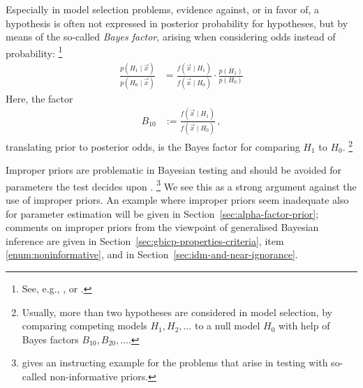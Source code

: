 Especially in model selection problems, evidence against, or in favor of, a hypothesis
is often not expressed in posterior probability for hypotheses, but by means of the so-called \emph{Bayes factor},
arising when considering odds instead of probability:%
\footnote{See, e.g., \textcite[\S 5.2.2, Def.~5.2.5, p.~227]{2007:robert}, or \textcite[p.~776]{1995:kass-raftery}.}
\begin{align*}
\frac{p(H_1\mid\vec{x})}{p(H_0\mid\vec{x})} &= \frac{f(\vec{x}\mid H_1)}{f(\vec{x}\mid H_0)} \cdot \frac{p(H_1)}{p(H_0)}
\end{align*}
Here, the factor
\begin{align*}
B_{10} &:= \frac{f(\vec{x}\mid H_1)}{f(\vec{x}\mid H_0)}\,,
\end{align*}
translating prior to posterior odds, is the Bayes factor for comparing $H_1$ to $H_0$.%
\footnote{Usually, more than two hypotheses are considered in model selection,
by comparing competing models $H_1, H_2, \ldots$ to a null model $H_0$
with help of Bayes factors $B_{10}, B_{20}, \ldots$.}

Improper priors are problematic in Bayesian testing \parencite[\S 5.2.5]{2007:robert}
and should be avoided for parameters the test decides upon \parencite[p.~782]{1995:kass-raftery}.%
\footnote{\Textcite[\S 5.5.4 (j)]{1991:walley} gives an instructing example for the problems
that arise in testing with so-called non-informative priors.}
We see this as a strong argument against the use of improper priors.
An example where improper priors seem inadequate also for parameter estimation
will be given in Section~\ref{sec:alpha-factor-prior};
comments on improper priors from the viewpoint of generalised Bayesian inference
are given in Section~\ref{sec:gbicp-properties-criteria},
item \ref{enum:noninformative}, and in Section~\ref{sec:idm-and-near-ignorance}.

\iffalse
\cite[p.~235f]{2007:robert}
\begin{quote}
The difficulties encountered with noninformative priors in testing
also point out that a testing problem cannot be treated in a coherent way if no prior information is available,
that is, that the information brought by the observations alone is usually not enough
to infer about the truth of a hypothesis in categorical fashion (\emph{yes}/\emph{no}).
This obviously reinforces the the motivation for a Bayesian treatment of such testing problems,
since it is the only coherent approach taking advantage of the residual information.
\end{quote}
\fi

